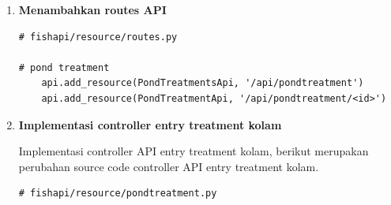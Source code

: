 \begin{enumerate}[1.]
\item \textbf{Menambahkan routes API}

\begin{lstlisting}
# fishapi/resource/routes.py

# pond treatment
    api.add_resource(PondTreatmentsApi, '/api/pondtreatment')
    api.add_resource(PondTreatmentApi, '/api/pondtreatment/<id>')
\end{lstlisting}




\item \textbf{Implementasi controller entry treatment kolam}

Implementasi controller API entry treatment kolam, berikut merupakan perubahan source code controller API entry treatment kolam.

\begin{lstlisting}
# fishapi/resource/pondtreatment.py


\end{lstlisting}
\end{enumerate}
